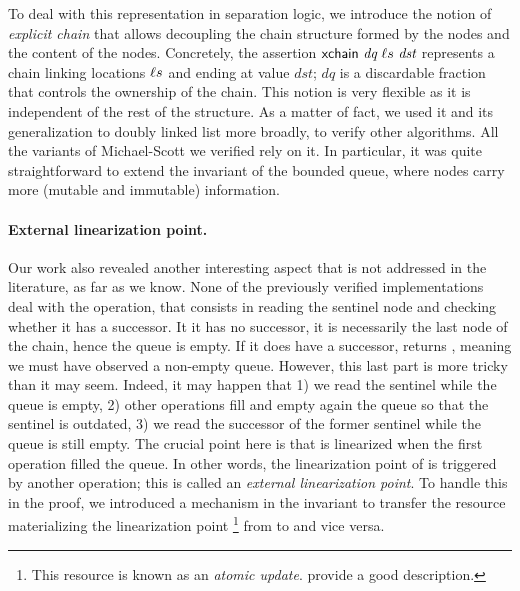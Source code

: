 To deal with this representation in separation logic, we introduce the notion of \emph{explicit chain} that allows decoupling the chain structure formed by the nodes and the content of the nodes.
Concretely, the assertion $\textlog{xchain}\ \textit{dq}\ \loc{}s\ \textit{dst}$ represents a chain linking locations $\ell{}s$ and ending at value $\textit{dst}$; $\textit{dq}$ is a discardable fraction~\citep*{DBLP:conf/cpp/VindumB21} that controls the ownership of the chain.
This notion is very flexible as it is independent of the rest of the structure.
As a matter of fact, we used it and its generalization to doubly linked list more broadly, to verify other algorithms.
All the variants of Michael-Scott we verified rely on it.
In particular, it was quite straightforward to extend the invariant of the bounded queue, where nodes carry more (mutable and immutable) information.

\paragraph{External linearization point.}
Our work also revealed another interesting aspect that is not addressed in the literature, as far as we know.
None of the previously verified implementations deal with the  operation, that consists in reading the sentinel node and checking whether it has a successor.
It it has no successor, it is necessarily the last node of the chain, hence the queue is empty.
If it does have a successor,  returns , meaning we must have observed a non-empty queue.
However, this last part is more tricky than it may seem.
Indeed, it may happen that 1) we read the sentinel while the queue is empty, 2) other operations fill and empty again the queue so that the sentinel is outdated, 3) we read the successor of the former sentinel while the queue is still empty.
The crucial point here is that  is linearized when the first  operation filled the queue.
In other words, the linearization point of  is triggered by another operation; this is called an \emph{external linearization point}.
To handle this in the proof, we introduced a mechanism in the invariant to transfer the \Iris resource materializing the linearization point%
\footnote{
This resource is known as an \emph{atomic update}.
\citet*{DBLP:journals/pacmpl/MulderK23} provide a good description.
}
from  to  and vice versa.

